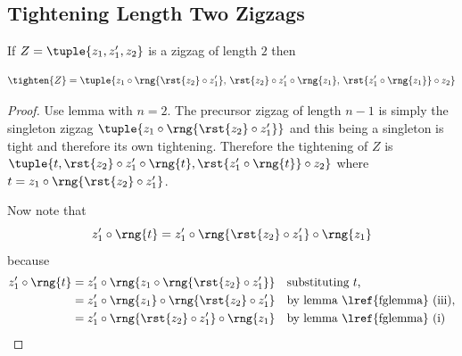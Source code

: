 \subsection{Tightening Length Two Zigzags}
{%
\newcommand {\tighteningOne}{z_1 \circ \rng{\rst{z_2} \circ z'_1}}
\newcommand {\tighteningTwo}{\rst{z_2} \circ z'_1 \circ \rng{z_1}}
\newcommand {\tighteningThree}{\rst{z'_1 \circ \rng{z_1}} \circ z_2}
\begin{lemma}
If $Z=\tuple{z_1,z'_1,z_2}$ is a zigzag of length $2$
then

\[
\tighten{Z}=\tuple{ \tighteningOne,\,\tighteningTwo,\,\tighteningThree}
\]
\end{lemma}
\begin{proof}
\newcommand {\longTighteningTwo}{\rst{z_2} \circ z'_1 \circ \rng{t}}
\newcommand {\longTighteningThree}{\rst{z'_1 \circ \rng{t}} \circ z_2}
Use lemma  with $n=2$. The precursor zigzag of length $n-1$ is simply the singleton zigzag \nudgeup{0.55cm}$\tuple{\tighteningOne}$ and this being a  singleton is tight and therefore its own tightening. Therefore the tightening of $Z$ is 
\nudgeup{0.55cm}$\tuple{t, \longTighteningTwo,\longTighteningThree}$
where $t = \tighteningOne$. 

Now note that 
\begin{equation}
\label{tighteningTwoIntermediate}
z'_1 \circ \rng{t} = z'_1 \circ \rng{\rst{z_2} \circ z'_1} \circ \rng{z_1}
\end{equation}  
because
\begin{align*}
z'_1 \circ \rng{t} 
     &= z'_1 \circ \rng{\tighteningOne} 
     && \mbox{substituting $t$,}\\
     &= z'_1 \circ \rng{z_1} \circ \rng{\rst{z_2} \circ z'_1} 
     && \mbox{by lemma \lref{fglemma} (iii),}\\
     &= z'_1 \circ \rng{\rst{z_2} \circ z'_1}  \circ \rng{z_1}
     && \mbox{by lemma \lref{fglemma} (i)}
\end{align*}


\end{proof}}
